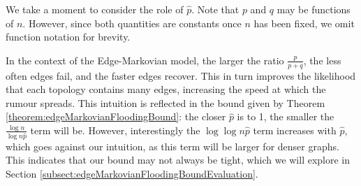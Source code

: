 We take a moment to consider the role of $\hat{p}$. Note that $p$ and $q$ may be functions of $n$. However, since both quantities are constants once $n$ has been fixed, we omit function notation for brevity.

In the context of the Edge-Markovian model, the larger the ratio $\frac{p}{p+q}$, the less often edges fail, and the faster edges recover. %
This in turn improves the likelihood that each topology contains many edges, increasing the speed at which the rumour spreads. This intuition is reflected in the bound given by Theorem \ref{theorem:edgeMarkovianFloodingBound}: the closer $\hat{p}$ is to 1, the smaller the $\frac{\log n}{\log n \hat{p}}$ term will be. However, interestingly the $\log \log n \hat{p}$ term increases with $\hat{p}$, which goes against our intuition, as this term will be larger for denser graphs. 
This indicates that our bound may not always be tight, which we will explore in Section \ref{subsect:edgeMarkovianFloodingBoundEvaluation}. %


